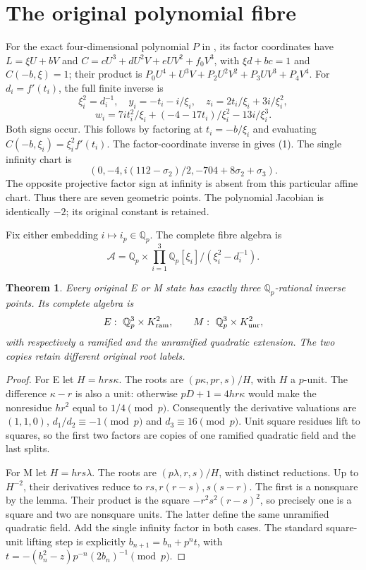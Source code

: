 \documentclass[11pt,reqno]{amsart}
\newtheorem{theorem}{Theorem}\newtheorem{lemma}[theorem]{Lemma}
\begin{document}
\section{The original polynomial fibre}
For the exact four-dimensional polynomial $P$ in \cite[GF1]{Zeta}, its factor
coordinates have $L=\xi U+bV$ and $C=cU^3+dU^2V+eUV^2+f_0V^3$, with
$\xi d+bc=1$ and $C(-b,\xi)=1$; their product is
$P_0U^4+U^3V+P_2U^2V^2+P_3UV^3+P_4V^4$.
For $d_i=f'(t_i)$, the full finite inverse is
\[
 \xi_i^2=d_i^{-1},\quad y_i=-t_i-i/\xi_i,\quad
 z_i=2t_i/\xi_i+3i/\xi_i^2,
\]
\[
 w_i=7it_i^2/\xi_i+(-4-17t_i)/\xi_i^2-13i/\xi_i^3.
                                                               \tag{1}
\]
Both signs occur. This follows by factoring at $t_i=-b/\xi_i$ and evaluating
$C(-b,\xi_i)=\xi_i^2f'(t_i)$. The factor-coordinate inverse in
\cite[GF5--7]{Zeta} gives (1). The single infinity chart is
\[
 (0,-4,i(112-\sigma_2)/2,-704+8\sigma_2+\sigma_3).       \tag{2}
\]
The opposite projective factor sign at infinity is absent from this particular
affine chart. Thus there are seven geometric points. The polynomial Jacobian
is identically $-2$; its original constant is retained.

Fix either embedding $i\mapsto i_p\in\mathbb Q_p$. The complete fibre algebra is
\[
 \mathcal A=\mathbb Q_p\times
 \prod_{i=1}^3\mathbb Q_p[\xi_i]/(\xi_i^2-d_i^{-1}).       \tag{3}
\]

\begin{theorem}
Every original E or M state has exactly three $\mathbb Q_p$-rational inverse
points. Its complete algebra is
\[
 E:\ \mathbb Q_p^3\times K_{\rm ram}^2,
 \qquad M:\ \mathbb Q_p^3\times K_{\rm unr}^2,
\]
with respectively a ramified and the unramified quadratic extension. The two
copies retain different original root labels.
\end{theorem}
\begin{proof}
For E let $H=hrs\kappa$. The roots are $(p\kappa,pr,s)/H$, with $H$ a $p$-unit.
The difference $\kappa-r$ is also a unit: otherwise $pD+1=4hr\kappa$ would
make the nonresidue $hr^2$ equal to $1/4\pmod p$.
Consequently the derivative valuations are $(1,1,0)$,
$d_1/d_2\equiv-1\pmod p$ and $d_3\equiv16\pmod p$.
Unit square residues lift to squares, so the first two factors are copies of one
ramified quadratic field and the last splits.

For M let $H=hrs\lambda$. The roots are $(p\lambda,r,s)/H$, with distinct
reductions. Up to $H^{-2}$, their derivatives reduce to
$rs,r(r-s),s(s-r)$. The first is a nonsquare by the lemma. Their product is the
square $-r^2s^2(r-s)^2$, so precisely one is a square and two are nonsquare units.
The latter define the same unramified quadratic field. Add the single infinity
factor in both cases. The standard square-unit lifting step is explicitly
$b_{n+1}=b_n+p^n t$, with
$t=-(b_n^2-z)p^{-n}(2b_n)^{-1}\pmod p$.
\end{proof}
\end{document}
